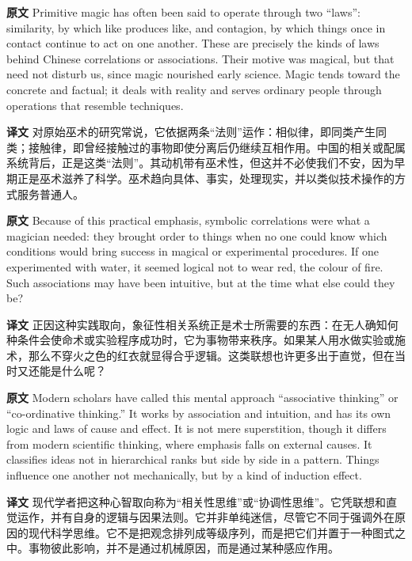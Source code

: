\documentclass[UTF8,zihao=-4]{ctexart}
\newcommand{\BodyFont}{\fontsize{10.5pt}{15.5pt}\selectfont}
\newcommand{\origlabel}{\textbf{原文}\quad}
\newcommand{\translabel}{\textbf{译文}\quad}
\newenvironment{enblock}{\par\noindent\begingroup\BodyFont\origlabel}{\par\endgroup}
\newenvironment{zhblock}{\par\noindent\begingroup\BodyFont\translabel}{\par\endgroup\vspace{0.35em}}
\begin{document}
\begin{enblock}
Primitive magic has often been said to operate through two ``laws'': similarity, by which like produces like, and contagion, by which things once in contact continue to act on one another. These are precisely the kinds of laws behind Chinese correlations or associations. Their motive was magical, but that need not disturb us, since magic nourished early science. Magic tends toward the concrete and factual; it deals with reality and serves ordinary people through operations that resemble techniques.
\end{enblock}
\begin{zhblock}
对原始巫术的研究常说，它依据两条“法则”运作：相似律，即同类产生同类；接触律，即曾经接触过的事物即使分离后仍继续互相作用。中国的相关或配属系统背后，正是这类“法则”。其动机带有巫术性，但这并不必使我们不安，因为早期正是巫术滋养了科学。巫术趋向具体、事实，处理现实，并以类似技术操作的方式服务普通人。
\end{zhblock}

\begin{enblock}
Because of this practical emphasis, symbolic correlations were what a magician needed: they brought order to things when no one could know which conditions would bring success in magical or experimental procedures. If one experimented with water, it seemed logical not to wear red, the colour of fire. Such associations may have been intuitive, but at the time what else could they be?
\end{enblock}
\begin{zhblock}
正因这种实践取向，象征性相关系统正是术士所需要的东西：在无人确知何种条件会使命术或实验程序成功时，它为事物带来秩序。如果某人用水做实验或施术，那么不穿火之色的红衣就显得合乎逻辑。这类联想也许更多出于直觉，但在当时又还能是什么呢？
\end{zhblock}

\begin{enblock}
Modern scholars have called this mental approach ``associative thinking'' or ``co-ordinative thinking.'' It works by association and intuition, and has its own logic and laws of cause and effect. It is not mere superstition, though it differs from modern scientific thinking, where emphasis falls on external causes. It classifies ideas not in hierarchical ranks but side by side in a pattern. Things influence one another not mechanically, but by a kind of induction effect.
\end{enblock}
\begin{zhblock}
现代学者把这种心智取向称为“相关性思维”或“协调性思维”。它凭联想和直觉运作，并有自身的逻辑与因果法则。它并非单纯迷信，尽管它不同于强调外在原因的现代科学思维。它不是把观念排列成等级序列，而是把它们并置于一种图式之中。事物彼此影响，并不是通过机械原因，而是通过某种感应作用。
\end{zhblock}
\end{document}
